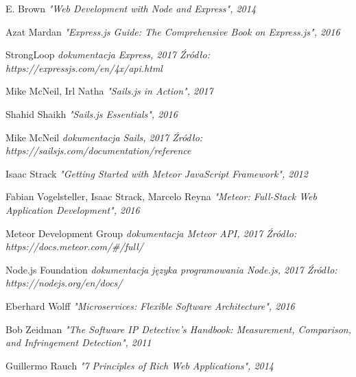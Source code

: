 \documentclass[12pt]{report}
\begin{document}
\begin{thebibliography}{99}
    E. Brown \newline
    \textit{"Web Development with Node and Express", 2014}

    Azat Mardan \newline
    \textit{"Express.js Guide: The Comprehensive Book on Express.js", 2016}

    StrongLoop \newline
    \textit{dokumentacja Express, 2017 \newline Źródło: https://expressjs.com/en/4x/api.html}

    Mike McNeil, Irl Natha \newline
    \textit{"Sails.js in Action", 2017}

    Shahid Shaikh \newline
    \textit{"Sails.js Essentials", 2016}

    Mike McNeil \newline
    \textit{dokumentacja Sails, 2017 \newline Źródło: https://sailsjs.com/documentation/reference}

    Isaac Strack \newline
    \textit{"Getting Started with Meteor JavaScript Framework", 2012}

    Fabian Vogelsteller, Isaac Strack, Marcelo Reyna \newline
    \textit{"Meteor: Full-Stack Web Application Development", 2016}

    Meteor Development Group \newline
    \textit{dokumentacja Meteor API, 2017 \newline Źródło: https://docs.meteor.com/\#/full/}

    Node.js Foundation \newline
    \textit{dokumentacja języka programowania Node.js, 2017 \newline Źródło: https://nodejs.org/en/docs/}

    Eberhard Wolff \newline
    \textit{"Microservices: Flexible Software Architecture", 2016}

    Bob Zeidman \newline
    \textit{"The Software IP Detective's Handbook: Measurement, Comparison, and Infringement Detection", 2011}
    
    Guillermo Rauch \newline
    \textit{"7 Principles of Rich Web Applications", 2014}

\end{thebibliography}


\listoffigures
\end{document}
